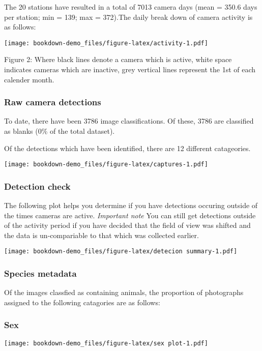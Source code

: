 \documentclass[]{book}
\begin{document}
The 20 stations have resulted in a total of 7013 camera days (mean =
350.6 days per station; min = 139; max = 372).The daily break down of
camera activity is as follows:

\texttt{[image: bookdown-demo\_files/figure-latex/activity-1.pdf]}

Figure 2: Where black lines denote a camera which is active, white space
indicates cameras which are inactive, grey vertical lines represent the
1st of each calender month.

\subsubsection{Raw camera detections}\label{raw-camera-detections}

To date, there have been 3786 image classifications. Of these, 3786 are
classified as blanks (0\% of the total dataset).

Of the detections which have been identified, there are 12 different
catageories.

\texttt{[image: bookdown-demo\_files/figure-latex/captures-1.pdf]}

\subsubsection{Detection check}\label{detection-check}

The following plot helps you determine if you have detections occuring
outside of the times cameras are active. \emph{Important note} You can
still get detections outside of the activity period if you have decided
that the field of view was shifted and the data is un-compariable to
that which was collected earlier.

\texttt{[image: bookdown-demo\_files/figure-latex/detecion summary-1.pdf]}

\subsubsection{Species metadata}\label{species-metadata}

Of the images classfied as containing animals, the proportion of
photographs assigned to the following catagories are as follows:

\subsubsection{Sex}\label{sex}

\texttt{[image: bookdown-demo\_files/figure-latex/sex plot-1.pdf]}
\end{document}
